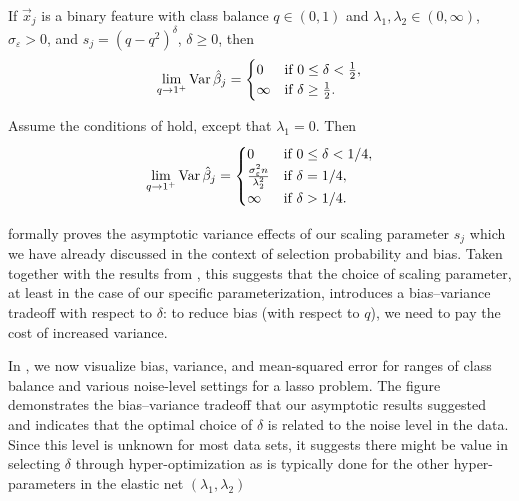 \begin{theorem}
  \label{thm:classbalance-variance}
  If \(\vec{x}_j\) is a binary feature with class balance \(q \in (0, 1)\) and \(\lambda_1,\lambda_2 \in (0,\infty)\), \(\sigma_\varepsilon > 0\), and \(s_j = (q - q^2)^{\delta}\), \(\delta \geq 0\), then
  \[
    \lim_{q \rightarrow 1^+} \operatorname{Var} \hat{\beta}_j =
    \begin{cases}
      0      & \text{if } 0 \leq \delta < \frac{1}{2}, \\
      \infty & \text{if } \delta \geq \frac{1}{2}.
    \end{cases}
  \]
\end{theorem}

\begin{corollary}
  \label{cor:ridge-variance}
  Assume the conditions of  hold, except that \(\lambda_1 = 0\). Then
  \[
    \lim_{q \rightarrow 1^+} \operatorname{Var} \hat{\beta}_j =
    \begin{cases}
      0                                          & \text{if } 0 \leq \delta < 1/4, \\
      \frac{\sigma_\varepsilon^2 n}{\lambda_2^2} & \text{if } \delta = 1/4,        \\
      \infty                                     & \text{if } \delta > 1/4.
    \end{cases}
  \]
\end{corollary}

 formally proves the asymptotic variance effects of our scaling parameter \(s_j\) which we have already discussed in the context of selection probability and bias. Taken together with the results from , this suggests that the choice of scaling parameter, at least in the case of our specific parameterization, introduces a bias--variance tradeoff with respect to \(\delta\): to reduce bias (with respect to \(q\)), we need to pay the cost of increased variance.

In , we now visualize bias, variance, and mean-squared error for ranges of class balance and various noise-level settings for a lasso problem. The figure demonstrates the bias--variance tradeoff that our asymptotic results suggested and indicates that the optimal choice of \(\delta\) is related to the noise level in the data. Since this level is unknown for most data sets, it suggests there might be value in selecting \(\delta\) through hyper-optimization as is typically done for the other hyper-parameters in the elastic net \((\lambda_1, \lambda_2)\)

